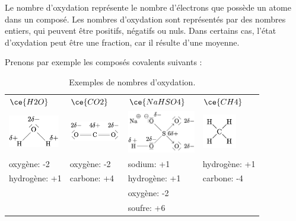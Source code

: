 \documentclass[
  11pt,
  a4paper,
  openany]{book}
\begin{document}
Le nombre d'oxydation représente le nombre d'électrons que possède un atome dans un composé. Les nombres d'oxydation sont représentés par des nombres entiers, qui peuvent être positifs, négatifs ou nuls. Dans certains cas, l'état d'oxydation peut être une fraction, car il résulte d'une moyenne.

Prenons par exemple les composés covalents suivants :

\begin{longtable}[]{@{}
  >{\centering\arraybackslash}p{}
  >{\centering\arraybackslash}p{}
  >{\centering\arraybackslash}p{}
  >{\centering\arraybackslash}p{}@{}}
\caption{\label{tab:tab-NO-examples} Exemples de nombres d'oxydation.}\tabularnewline
\toprule\noalign{}
\endfirsthead
\endhead
\bottomrule\noalign{}
\endlastfoot
\(\ce{H2O}\) & \(\ce{CO2}\) & \(\ce{NaHSO4}\) & \(\ce{CH4}\) \\
\includegraphics[width=6em,height=\textheight]{images/mol2D/H2O-charge.png} & \includegraphics[width=6em,height=\textheight]{images/mol2D/CO2-charge.png} & \includegraphics[width=8em,height=\textheight]{images/mol2D/NaHSO4-charge.png} & \includegraphics[width=4em,height=\textheight]{images/mol2D/CH4.jpg} \\
oxygène: -2 & oxygène: -2 & sodium: +1 & hydrogène: +1 \\
hydrogène: +1 & carbone: +4 & hydrogène: +1 & carbone: -4 \\
& & oxygène: -2 & \\
& & soufre: +6 & \\
\end{longtable}
\end{document}
